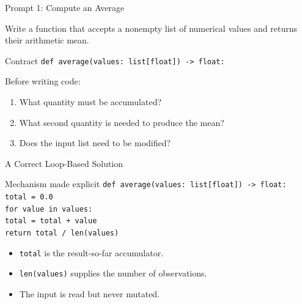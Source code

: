 \documentclass[aspectratio=169,10pt]{beamer}
\begin{document}
\begin{frame}{Prompt 1: Compute an Average}
  \begin{activity}
    Write a function that accepts a nonempty list of numerical values and returns their arithmetic mean.
  \end{activity}

  \begin{block}{Contract}
    \texttt{def average(values: list[float]) -> float:}
  \end{block}

  Before writing code:
  \begin{enumerate}
    \item What quantity must be accumulated?
    \item What second quantity is needed to produce the mean?
    \item Does the input list need to be modified?
  \end{enumerate}
\end{frame}

\begin{frame}{A Correct Loop-Based Solution}
  \begin{block}{Mechanism made explicit}
    \texttt{def average(values: list[float]) -> float:}\\
    \hspace*{0.20in}\texttt{total = 0.0}\\
    \hspace*{0.20in}\texttt{for value in values:}\\
    \hspace*{0.40in}\texttt{total = total + value}\\
    \hspace*{0.20in}\texttt{return total / len(values)}
  \end{block}

  \begin{itemize}
    \item \texttt{total} is the result-so-far accumulator.
    \item \texttt{len(values)} supplies the number of observations.
    \item The input is read but never mutated.
  \end{itemize}
\end{frame}
\end{document}

